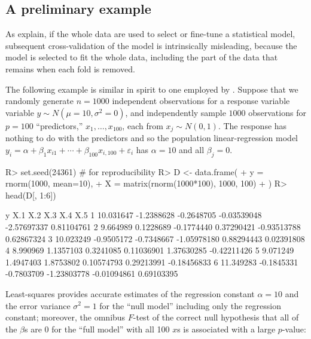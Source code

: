 \documentclass[
]{jss}
\begin{document}
\hypertarget{a-preliminary-example}{%
\subsection{A preliminary example}\label{a-preliminary-example}}

As \citet[Sec. 7.10.2: ``The Wrong and Right Way to Do
Cross-validation'']{HastieTibshiraniFriedman:2009} explain, if the whole
data are used to select or fine-tune a statistical model, subsequent
cross-validation of the model is intrinsically misleading, because the
model is selected to fit the whole data, including the part of the data
that remains when each fold is removed.

The following example is similar in spirit to one employed by
\citet{HastieTibshiraniFriedman:2009}. Suppose that we randomly generate
\(n = 1000\) independent observations for a response variable variable
\(y \sim N(\mu = 10, \sigma^2 = 0)\), and independently sample \(1000\)
observations for \(p = 100\) ``predictors,'' \(x_1, \ldots, x_{100}\),
each from \(x_j \sim N(0, 1)\). The response has nothing to do with the
predictors and so the population linear-regression model
\(y_i = \alpha + \beta_1 x_{i1} + \cdots + \beta_{100} x_{i,100} + \varepsilon_i\)
has \(\alpha = 10\) and all \(\beta_j = 0\).

\begin{CodeChunk}
\begin{CodeInput}
R> set.seed(24361) # for reproducibility
R> D <- data.frame(
+   y = rnorm(1000, mean=10),
+   X = matrix(rnorm(1000*100), 1000, 100)
+ )
R> head(D[, 1:6])
\end{CodeInput}
\begin{CodeOutput}
          y        X.1        X.2         X.3         X.4         X.5
1 10.031647 -1.2388628 -0.2648705 -0.03539048 -2.57697337  0.81104761
2  9.664989  0.1228689 -0.1774440  0.37290421 -0.93513788  0.62867324
3 10.023249 -0.9505172 -0.7348667 -1.05978180  0.88294443  0.02391808
4  8.990969  1.1357103  0.3241085  0.11036901  1.37630285 -0.42211426
5  9.071249  1.4947403  1.8753802  0.10574793  0.29213991 -0.18456833
6 11.349283 -0.1845331 -0.7803709 -1.23803778 -0.01094861  0.69103395
\end{CodeOutput}
\end{CodeChunk}

Least-squares provides accurate estimates of the regression constant
\(\alpha = 10\) and the error variance \(\sigma^2 = 1\) for the ``null
model'' including only the regression constant; moreover, the omnibus
\(F\)-test of the correct null hypothesis that all of the \(\beta\)s are
0 for the ``full model'' with all 100 \(x\)s is associated with a large
\(p\)-value:
\end{document}
